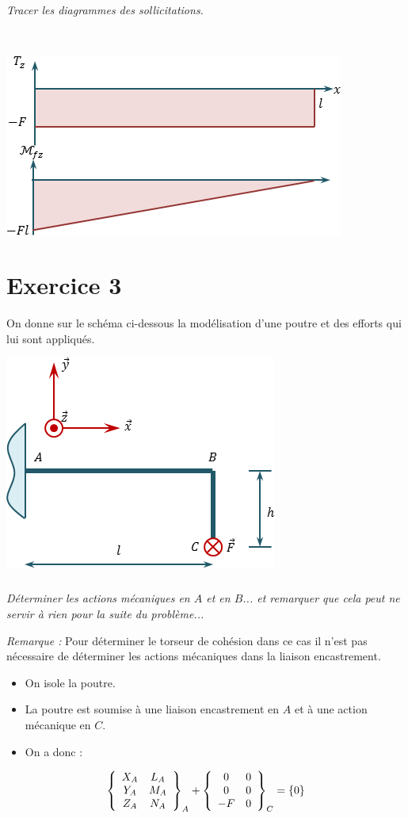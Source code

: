 \documentclass[10pt,fleqn]{article} %
\begin{document}
\begin{multicols}{2}
\begin{corrige}
\end{corrige}
\else
\fi

\subparagraph{}
\textit{Tracer les diagrammes des sollicitations.}
\ifprof
\begin{corrige}~\\

\begin{center}
\includegraphics[width=.6\linewidth]{images/exo_01_01_corr_02}
\end{center}
\end{corrige}
\else
\fi

\section*{Exercice 3}
\setcounter{subparagraph}{0}
On donne sur le schéma ci-dessous la modélisation d'une poutre et des efforts qui lui sont appliqués.
\begin{center}
\includegraphics[width=.45\textwidth]{images/exo_02}
\end{center}

\subparagraph{}
\textit{Déterminer les actions mécaniques en $A$ et en $B$... et remarquer que cela peut ne servir à rien pour la suite du problème...}
\ifprof
\begin{corrige}
\textit{Remarque :}
Pour déterminer le torseur de cohésion dans ce cas il n'est pas nécessaire de déterminer les actions mécaniques dans la liaison encastrement.

\begin{itemize}[label=,font=\color{ocre}] 
\item On isole la poutre.
\item La poutre est soumise à une liaison encastrement en $A$ et à une action mécanique en $C$.
\item On a donc :
\end{itemize}
$$
\torseurcol{X_A}{Y_A}{Z_A}{L_A}{M_A}{N_A}{A}
+\torseurcol{0}{0}{-F}{0}{0}{0}{C}
=\{ 0\}
$$


\end{corrige}
\end{multicols}
\end{document}
